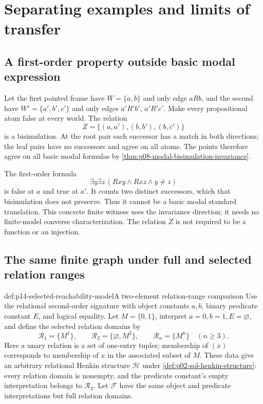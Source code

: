 \section{Separating examples and limits of transfer}
\label{sec:p14-translation-separating-limits}

\subsection{A first-order property outside basic modal expression}

Let the first pointed frame have \(W=\{a,b\}\) and only edge \(aRb\),
and the second have \(W'=\{a',b',c'\}\) and only edges
\(a'R'b'\), \(a'R'c'\). Make every propositional atom false at every
world. The relation
\[
 Z=\{(a,a'),(b,b'),(b,c')\}
\]
is a bisimulation. At the root pair each successor has a match in both
directions; the leaf pairs have no successors and agree on all atoms.
The points therefore agree on all basic modal formulas by
\cref{thm:p08-modal-bisimulation-invariance}.

The first-order formula
\[
 \exists y\exists z\,(Rxy\land Rxz\land y\ne z)
\]
is false at \(a\) and true at \(a'\). It counts two distinct
successors, which that bisimulation does not preserve. Thus it cannot be
a basic modal standard translation. This concrete finite witness uses the
invariance direction; it needs no finite-model converse characterization.
The relation \(Z\) is not required to be a function or an injection.

\subsection{The same finite graph under full and selected relation ranges}

\begin{hbdefinition}{def:p14-selected-reachability-model}{A two-element relation-range comparison}
Use the relational second-order signature with object constants \(a,b\),
binary predicate constant \(E\), and logical equality. Let \(M=\{0,1\}\),
interpret \(a=0,b=1,E=\varnothing\), and define the selected relation
domains by
\[
 \mathcal R_1=\{M^1\},\qquad
 \mathcal R_2=\{\varnothing,M^2\},\qquad
 \mathcal R_n=\{M^n\}\quad(n\geq3).
\]
Here a unary relation is a set of one-entry tuples; membership of \((x)\)
corresponds to membership of \(x\) in the associated subset of \(M\).
These data give an arbitrary relational Henkin structure \(\mathcal H\)
under \cref{def:p02-sol-henkin-structure}: every relation domain is
nonempty, and the predicate constant's empty interpretation belongs to
\(\mathcal R_2\). Let \(\mathcal F\) have the same object and predicate
interpretations but full relation domains.
\end{hbdefinition}

